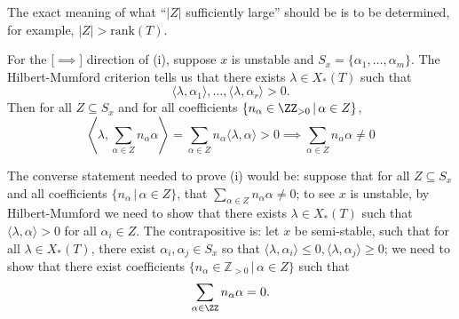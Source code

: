 The exact meaning of what ``$|Z|$ sufficiently large'' should be is to be determined, for example, $|Z| > \mathrm{rank}(T)$.

For the [$\implies$] direction of (i), suppose $x$ is unstable and $S_x = \{\alpha_1, \ldots, \alpha_m\}$.
The Hilbert-Mumford criterion tells us that there exists $\lambda \in X_*(T)$ such that 
$$\langle \lambda, \alpha_1 \rangle, \ldots, \langle \lambda, \alpha_r \rangle > 0.$$
Then for all $Z \subseteq S_x$ and for all coefficients $\{n_\alpha \in \ZZ_{>0} \, | \, \alpha \in Z\}$,
$$\left\langle\lambda, \sum_{\alpha \in Z}  n_\alpha  \alpha \right \rangle
= \sum_{\alpha \in Z} n_\alpha  \langle \lambda, \alpha \rangle > 0 \implies \sum_{\alpha \in Z}  n_\alpha  \alpha \ne 0$$

The converse statement needed to prove (i) would be: 
suppose that for all $Z \subseteq S_x$ and all coefficients $\{n_\alpha \, | \, \alpha \in Z\}$, that $\sum_{\alpha \in Z} n_\alpha \alpha \ne 0$; to see $x$ is unstable, by Hilbert-Mumford we need to show that there exists $\lambda \in X_*(T)$ such that $\langle \lambda, \alpha \rangle > 0$ for all $\alpha_i \in Z$.
The contrapositive is: 
let $x$ be semi-stable, such that for all $\lambda \in X_*(T)$, there exist $\alpha_i, \alpha_j \in S_x$ so that $\langle \lambda, \alpha_i \rangle \le 0, \langle \lambda, \alpha_j \rangle \ge 0$; 
we need to show that there exist coefficients $\{n_\alpha \in \mathbb{Z}_{>0} \, | \, \alpha \in Z\}$ such that 
$$\sum_{\alpha \in \ZZ} n_\alpha \alpha = 0.$$


